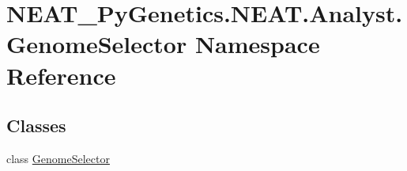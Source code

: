 \hypertarget{namespaceNEAT__PyGenetics_1_1NEAT_1_1Analyst_1_1GenomeSelector}{}\section{N\+E\+A\+T\+\_\+\+Py\+Genetics.\+N\+E\+A\+T.\+Analyst.\+Genome\+Selector Namespace Reference}
\label{namespaceNEAT__PyGenetics_1_1NEAT_1_1Analyst_1_1GenomeSelector}
\subsection*{Classes}
\begin{DoxyCompactItemize}
\item 
class \hyperlink{classNEAT__PyGenetics_1_1NEAT_1_1Analyst_1_1GenomeSelector_1_1GenomeSelector}{Genome\+Selector}
\end{DoxyCompactItemize}
